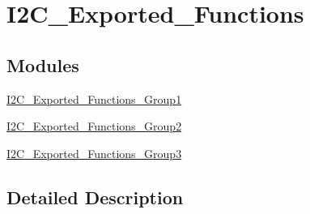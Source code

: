 \hypertarget{group___i2_c___exported___functions}{}\section{I2\+C\+\_\+\+Exported\+\_\+\+Functions}
\label{group___i2_c___exported___functions}
\subsection*{Modules}
\begin{DoxyCompactItemize}
\item 
\hyperlink{group___i2_c___exported___functions___group1}{I2\+C\+\_\+\+Exported\+\_\+\+Functions\+\_\+\+Group1}
\item 
\hyperlink{group___i2_c___exported___functions___group2}{I2\+C\+\_\+\+Exported\+\_\+\+Functions\+\_\+\+Group2}
\item 
\hyperlink{group___i2_c___exported___functions___group3}{I2\+C\+\_\+\+Exported\+\_\+\+Functions\+\_\+\+Group3}
\end{DoxyCompactItemize}


\subsection{Detailed Description}
